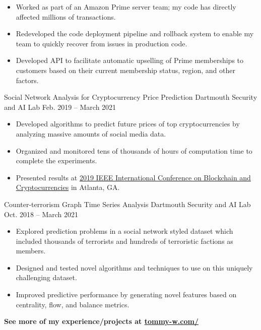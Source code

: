 \documentclass[11pt]{resume}
\begin{document}
    \begin{itemize}
        \setlength{\itemindent}{-0.8em}
        \item Worked as part of an Amazon Prime server team; my code has directly affected millions of
            transactions.
        \item Redeveloped the code deployment pipeline and rollback system to enable my team to 
            quickly recover from issues in production code.
        \item Developed API to facilitate automatic upselling of Prime memberships to customers 
            based on their current membership status, region, and other factors.
    \end{itemize}

    \medskip

    \datedentry
        {Social Network Analysis for Cryptocurrency Price Prediction}
        {Dartmouth Security and AI Lab}
        {Feb. 2019 -- March 2021}
        {}
    
    \begin{itemize}
        \setlength{\itemindent}{-0.8em}
        \item Developed algorithms to predict future prices of top cryptocurrencies by analyzing massive amounts of
            social media data.
        \item Organized and monitored tens of thousands of hours of computation time to complete 
            the experiments.
        \item Presented results at \href{https://www.computer.org/csdl/proceedings/blockchain/2019/1gjS4tubCmI}
            {2019 IEEE International Conference on Blockchain and Cryptocurrencies} in Atlanta, GA.
    \end{itemize}

    \divider

    \datedentry
        {Counter-terrorism Graph Time Series Analysis}
        {Dartmouth Security and AI Lab}
        {Oct. 2018 -- March 2021}
        {}

    \begin{itemize}
        \setlength{\itemindent}{-0.8em}
        \item Explored prediction problems in a social network styled dataset which included thousands of terrorists and hundreds of 
            terroristic factions as members.
        \item Designed and tested novel algorithms and techniques to use on this uniquely challenging dataset.
        \item Improved predictive performance by generating novel features based on centrality, flow, and balance metrics.
    \end{itemize}

    \divider

    \large\bfseries See more of my experience/projects at \href{https://tommy-w.com/}{tommy-w.com/}
\end{document}
